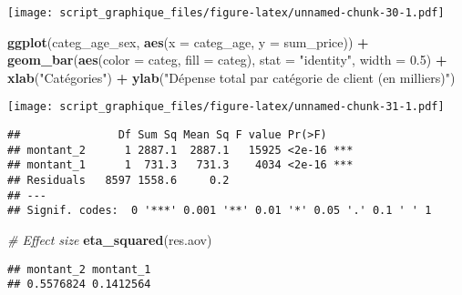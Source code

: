 \documentclass[
]{article}
\newenvironment{Shaded}{\begin{snugshade}}{\end{snugshade}}
\newcommand{\CommentTok}[1]{\textcolor[rgb]{0.56,0.35,0.01}{\textit{#1}}}
\newcommand{\DataTypeTok}[1]{\textcolor[rgb]{0.13,0.29,0.53}{#1}}
\newcommand{\DecValTok}[1]{\textcolor[rgb]{0.00,0.00,0.81}{#1}}
\newcommand{\FloatTok}[1]{\textcolor[rgb]{0.00,0.00,0.81}{#1}}
\newcommand{\KeywordTok}[1]{\textcolor[rgb]{0.13,0.29,0.53}{\textbf{#1}}}
\newcommand{\NormalTok}[1]{#1}
\newcommand{\OperatorTok}[1]{\textcolor[rgb]{0.81,0.36,0.00}{\textbf{#1}}}
\newcommand{\StringTok}[1]{\textcolor[rgb]{0.31,0.60,0.02}{#1}}
\begin{document}
\texttt{[image: script\_graphique\_files/figure-latex/unnamed-chunk-30-1.pdf]}

\begin{Shaded}
\begin{Highlighting}[]
\KeywordTok{ggplot}\NormalTok{(categ_age_sex, }\KeywordTok{aes}\NormalTok{(}\DataTypeTok{x =}\NormalTok{ categ_age, }\DataTypeTok{y =}\NormalTok{ sum_price)) }\OperatorTok{+}\StringTok{ }
\StringTok{  }\KeywordTok{geom_bar}\NormalTok{(}\KeywordTok{aes}\NormalTok{(}\DataTypeTok{color =}\NormalTok{ categ, }\DataTypeTok{fill =}\NormalTok{ categ),}
                 \DataTypeTok{stat =} \StringTok{"identity"}\NormalTok{, }\DataTypeTok{width =} \FloatTok{0.5}\NormalTok{) }\OperatorTok{+}
\StringTok{  }\KeywordTok{xlab}\NormalTok{(}\StringTok{"Catégories"}\NormalTok{) }\OperatorTok{+}\StringTok{ }
\StringTok{  }\KeywordTok{ylab}\NormalTok{(}\StringTok{"Dépense total par catégorie de client (en milliers)"}\NormalTok{)}
\end{Highlighting}
\end{Shaded}

\texttt{[image: script\_graphique\_files/figure-latex/unnamed-chunk-31-1.pdf]}

\begin{Shaded}
\end{Shaded}

\begin{verbatim}
##               Df Sum Sq Mean Sq F value Pr(>F)    
## montant_2      1 2887.1  2887.1   15925 <2e-16 ***
## montant_1      1  731.3   731.3    4034 <2e-16 ***
## Residuals   8597 1558.6     0.2                   
## ---
## Signif. codes:  0 '***' 0.001 '**' 0.01 '*' 0.05 '.' 0.1 ' ' 1
\end{verbatim}

\begin{Shaded}
\begin{Highlighting}[]
\CommentTok{# Effect size}
\KeywordTok{eta_squared}\NormalTok{(res.aov)}
\end{Highlighting}
\end{Shaded}

\begin{verbatim}
## montant_2 montant_1 
## 0.5576824 0.1412564
\end{verbatim}
\end{document}
